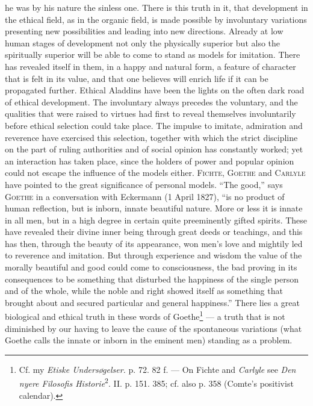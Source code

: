 \documentclass[12pt,a4paper,openany]{book}
\newcommand{\opage}[1]{\marginnote{\footnotesize\textit{[#1]}}}
\begin{document}
he was by his nature the sinless one. There is this truth in it, that development in the ethical field, as in the
organic field, is made possible by involuntary variations presenting new possibilities and leading into new
directions. Already at low human stages of development not only the physically superior but also the spiritually
superior will be able to come to stand as models for imitation. There has revealed itself in them, in a happy and
natural form, a feature of character that is felt in its value, and that one believes will enrich life if it can
be propagated further. Ethical Aladdins have been the lights on the often dark road of ethical development. The
involuntary always precedes the voluntary, and the qualities that were raised to virtues had
\opage{200}first to reveal themselves involuntarily before ethical selection could take place. The impulse to imitate,
admiration and reverence have exercised this selection, together with which the strict discipline on the part of
ruling authorities and of social opinion has constantly worked; yet an interaction has taken place, since the
holders of power and popular opinion could not escape the influence of the models either. \textsc{Fichte},
\textsc{Goethe} and \textsc{Carlyle} have pointed to the great significance of personal models. ``The good,''
says \textsc{Goethe} in a conversation with Eckermann (1 April 1827), ``is no product of human reflection, but is
inborn, innate beautiful nature. More or less it is innate in all men, but in a high degree in certain quite
preeminently gifted spirits. These have revealed their divine inner being through great deeds or teachings, and
this has then, through the beauty of its appearance, won men's love and mightily led to reverence and imitation.
But through experience and wisdom the value of the morally beautiful and good could come to consciousness, the
bad proving in its consequences to be something that disturbed the happiness of the single person and of the
whole, while the noble and right showed itself as something that brought about and secured particular and general
happiness.'' There lies a great biological and ethical truth in these words of Goethe\footnote[1]{Cf. my
\textit{Etiske Undersøgelser.} p. 72. 82 f. --- On Fichte and \emph{Carlyle} see \textit{Den nyere Filosofis
Historie}\textsuperscript{2}. II. p. 151. 385; cf. also p. 358 (Comte's positivist calendar).} --- a truth that is
not diminished by our having to leave the cause of the spontaneous variations (what Goethe calls the innate or
inborn in the eminent men) standing as a problem.
\end{document}
